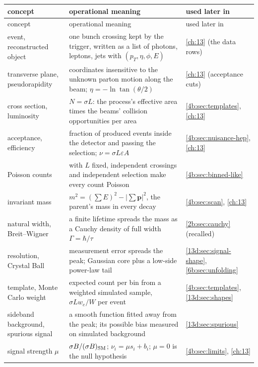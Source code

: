 \begin{small}
\setlength{\tabcolsep}{4pt}
\begin{xltabular}{\linewidth}{>{\raggedright\arraybackslash}p{3.0cm} >{\raggedright\arraybackslash}X >{\raggedright\arraybackslash}p{3.4cm}}
\toprule
concept & operational meaning & used later in \\
\midrule
\endfirsthead
\toprule
concept & operational meaning & used later in \\
\midrule
\endhead
\bottomrule
\endfoot
event, reconstructed object & one bunch crossing kept by the trigger, written as a list of photons, leptons, jets with $(p_T,\eta,\phi,E)$ & \cref{ch:13} (the data rows) \\
transverse plane, pseudorapidity & coordinates insensitive to the unknown parton motion along the beam; $\eta=-\ln\tan(\theta/2)$ & \cref{ch:13} (acceptance cuts) \\
cross section, luminosity & $N=\sigma L$: the process's effective area times the beams' collision opportunities per area & \cref{4b:sec:templates}, \cref{ch:13} \\
acceptance, efficiency & fraction of produced events inside the detector and passing the selection; $\nu=\sigma L\varepsilon A$ & \cref{4b:sec:nuisance-hep}, \cref{ch:13} \\
Poisson counts & with $L$ fixed, independent crossings and independent selection make every count Poisson & \cref{4b:sec:binned-like} \\
invariant mass & $m^2=(\sum E)^2-\lvert\sum\bm p\rvert^2$, the parent's mass in every decay & \cref{4b:sec:scan}, \cref{ch:13} \\
natural width, Breit--Wigner & a finite lifetime spreads the mass as a Cauchy density of full width $\Gamma=\hbar/\tau$ & \cref{2b:sec:cauchy} (recalled) \\
resolution, Crystal Ball & measurement error spreads the peak; Gaussian core plus a low-side power-law tail & \cref{13d:sec:signal-shape}, \cref{6b:sec:unfolding} \\
template, Monte Carlo weight & expected count per bin from a weighted simulated sample, $\sigma Lw_e/W$ per event & \cref{4b:sec:templates}, \cref{13d:sec:shapes} \\
sideband background, spurious signal & a smooth function fitted away from the peak; its possible bias measured on simulated background & \cref{13d:sec:spurious} \\
signal strength $\mu$ & $\sigma B/(\sigma B)_{\rm SM}$; $\nu_i=\mu s_i+b_i$; $\mu=0$ is the null hypothesis & \cref{4b:sec:limits}, \cref{ch:13} \\

\end{xltabular}
\end{small}
